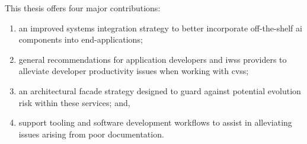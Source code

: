 This thesis offers four major contributions:

\begin{enumerate}[label=(\roman*),leftmargin=2\parindent]
  \item an improved systems integration strategy to better incorporate off-the-shelf \gls{ai} components into end-applications;
  \item general recommendations for application developers and \glspl{iws} providers to alleviate developer productivity issues when working with \glspl{cvs};
  \item an architectural facade strategy designed to guard against potential evolution risk within these services; and,
  \item support tooling and software development workflows to assist in alleviating issues arising from poor documentation.
\end{enumerate}

%
%

